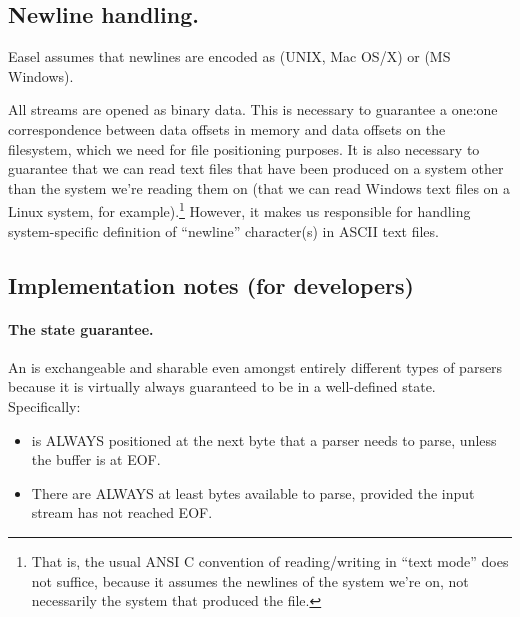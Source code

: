 \subsection{Newline handling.}

Easel assumes that newlines are encoded as \ccode{\n} (UNIX, Mac OS/X)
or \ccode{\r\n} (MS Windows).

All streams are opened as binary data. This is necessary to guarantee
a one:one correspondence between data offsets in memory and data
offsets on the filesystem, which we need for file positioning
purposes. It is also necessary to guarantee that we can read text
files that have been produced on a system other than the system we're
reading them on (that we can read Windows text files on a Linux
system, for example).\footnote{That is, the usual ANSI C convention of
  reading/writing in ``text mode'' does not suffice, because it
  assumes the newlines of the system we're on, not necessarily the
  system that produced the file.}  However, it makes us responsible
for handling system-specific definition of ``newline'' character(s) in
ASCII text files.






















 








\subsection{Implementation notes (for developers)}

\paragraph{The state guarantee.} An  is exchangeable
and sharable even amongst entirely different types of parsers because
it is virtually always guaranteed to be in a well-defined
state. Specifically:

\begin{itemize}
\item {} is ALWAYS positioned at the next byte
      that a parser needs to parse, unless the buffer is at EOF. 

\item There are ALWAYS at least  bytes available to
      parse, provided the input stream has not reached EOF.
\end{itemize}


